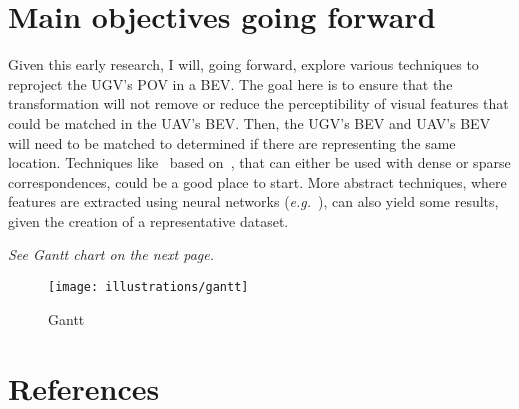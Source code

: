 \documentclass[11pt, a4paper]{article}
\begin{document}
    \section{Main objectives going forward}\label{sec:main-objectives-going-forward}

    Given this early research, I will, going forward, explore various techniques to reproject the UGV's POV in a BEV.
    The goal here is to ensure that the transformation will not remove or reduce the perceptibility of visual
    features that could be matched in the UAV's BEV.
    Then, the UGV's BEV and UAV's BEV will need to be matched to determined if there are representing the same
    location.
    Techniques like~\cite{comport_accurate_2007} based on~\cite{comport_statistically_2006}, that can either be used
    with dense or sparse correspondences, could be a good place to start.
    More abstract techniques, where features are extracted using neural networks (\textit{e.g.}~\cite{zhang_dual-bev_2025}),
    can also yield some results, given the creation of a representative dataset.

    \textit{See Gantt chart on the next page.}

    \newpage


    \begin{figure}[!ht]
        \centering
        \texttt{[image: illustrations/gantt]}
        \caption{Gantt}
        \label{fig:gantt}
    \end{figure}
    \FloatBarrier

    \newpage


    \section{References}\label{sec:references}

    \printbibliography[heading=none]
\end{document}
